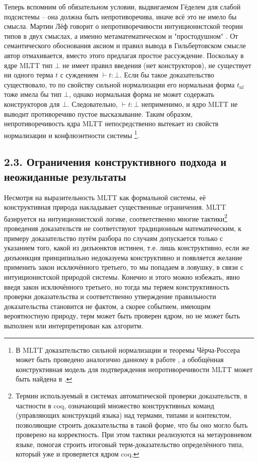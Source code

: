 \documentclass[14pt]{extarticle}
\begin{document}
	 Теперь вспомним об обязательном условии, выдвигаемом Гёделем для слабой подсистемы -- она должна быть непротиворечива, иначе всё это не имело бы смысла. Мартин Лёф говорит о непротиворечивости интуиционистской теории типов в двух смыслах, а именно метаматематическом и "простодушном" \cite[38]{martinlof1984intuitionistic}. От семантического обоснования аксиом и правил вывода в Гильбертовском смысле автор отмахивается, вместо этого предлагая простое рассуждение. Поскольку в ядре MLTT тип \(\bot\) не имеет правил введения (нет конструкторов), не существует ни одного терма \(t\) с суждением  \(\vdash t:\bot\). Если бы такое доказательство существовало, то по свойству сильной нормализации его нормальная форма \(t_{\mathrm{nf}}\) тоже имела бы тип \(\bot\), однако нормальная форма не может содержать конструкторов для \(\bot\). Следовательно, \(\vdash t:\bot\) неприменимо, и ядро MLTT не выводит противоречиво пустое высказывание. Таким образом, непротиворечивость ядра MLTT непосредственно вытекает из свойств нормализации и конфлюэнтности системы \footnote{В MLTT доказательство сильной нормализации и теоремы Чёрча-Россера может быть проведено аналогично данному в работе \cite{lambek1986introduction}, а обобщённая конструктивная модель для подтверждения непротиворечивости MLTT может быть найдена в \cite{nordstrom1990semantics}.}. 
	 
	\subsection*{2.3. Ограничения конструктивного подхода и неожиданные результаты}
	Несмотря на выразительность MLTT как формальной системы, её конструктивная природа накладывает существенные ограничения. MLTT базируется на интуиционистской логике, соответственно многие тактики\footnote{Термин используемый в системах автоматической проверки доказательств, в частности в coq, означающий множество конструктивных команд (управляющих конструкций языка) над термами, типами и контекстом, позволяющие строить доказательства в такой форме, что бы оно могло быть проверено на корректность. При этом тактики реализуются на метауровневом языке, помогая строить итоговый терм-доказательство определённого типа, который уже и проверяется ядром coq.} проведения доказательств не соответствуют традиционным математическим, к примеру доказательство путём разбора по случаям допускается только с указанием того, какой из дизъюнктов истинен, т.е. лишь конструктивно, если же дизъюнкция принципиально недоказуема конструктивно и появляется желание применить закон исключённого третьего, то мы попадаем в ловушку, в связи с интуиционистской природой системы. Конечно и этого можно избежать, явно введя закон исключённого третьего, но тогда мы теряем конструктивность проверки доказательства и соответственно утверждение правильности доказательства становится не фактом, а скорее событием, имеющим вероятностную природу, терм может быть проверен ядром, но не может быть выполнен или интерпретирован как алгоритм.
	
\end{document}
